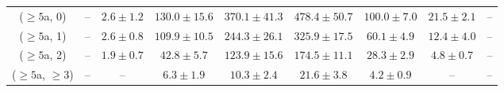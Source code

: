 \begin{table}[h!]
{\begin{tabular}{ccccccccc}
	($\ge5$a, 0) & -- & $2.6\pm 1.2$ & $130.0\pm 15.6$ & $370.1\pm 41.3$ & $478.4\pm 50.7$ & $100.0\pm 7.0$ & $21.5\pm 2.1$ & -- \\[0.5ex] 
	($\ge5$a, 1) & -- & $2.6\pm 0.8$ & $109.9\pm 10.5$ & $244.3\pm 26.1$ & $325.9\pm 17.5$ & $60.1\pm 4.9$ & $12.4\pm 4.0$ & -- \\[0.5ex] 
	($\ge5$a, 2) & -- & $1.9\pm 0.7$ & $42.8\pm 5.7$ & $123.9\pm 15.6$ & $174.5\pm 11.1$ & $28.3\pm 2.9$ & $4.8\pm 0.7$ & -- \\[0.5ex] 
	($\ge5$a, $\ge3$) & -- & -- & $6.3\pm 1.9$ & $10.3\pm 2.4$ & $21.6\pm 3.8$ & $4.2\pm 0.9$ & -- & -- \\[0.5ex] 
	\hline
	\hline
\end{tabular}}
\end{table}

